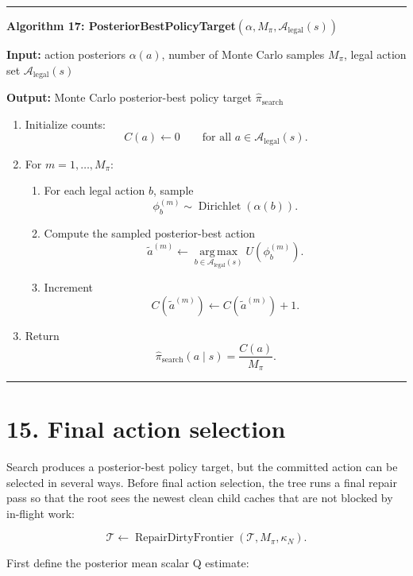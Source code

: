 \documentclass[11pt]{article}
\newcommand{\Dir}{\operatorname{Dirichlet}}
\newcommand{\argmax}{\operatorname*{arg\,max}}
\newcommand{\Tree}{\mathcal{T}}
\newcommand{\Legal}{\mathcal{A}_{\mathrm{legal}}}
\newcommand{\Utility}{U}
\newcommand{\RepairDirtyFrontier}{\operatorname{RepairDirtyFrontier}}
\newenvironment{algorithmblock}[1]
{
  \par\medskip
  \noindent\hrule\par\smallskip
  \noindent\textbf{#1}
  \par\smallskip
}
{
  \par\smallskip\noindent\hrule\par\medskip
}
\newcommand{\Input}{\textbf{Input: }}
\newcommand{\Output}{\textbf{Output: }}
\begin{document}
\begin{algorithmblock}{Algorithm 17: PosteriorBestPolicyTarget\((\alpha,M_\pi,\Legal(s))\)}

\Input action posteriors \(\alpha(a)\), number of Monte Carlo samples \(M_\pi\), legal action set \(\Legal(s)\)

\Output Monte Carlo posterior-best policy target \(\hat{\pi}_{\mathrm{search}}\)

\begin{enumerate}[leftmargin=2em]
  \item Initialize counts:
  \[
  C(a)\gets 0
  \qquad
  \text{for all } a\in\Legal(s).
  \]

  \item For \(m=1,\ldots,M_\pi\):

  \begin{enumerate}[leftmargin=2em]
    \item For each legal action \(b\), sample
    \[
    \phi_b^{(m)}
    \sim
    \Dir(\alpha(b)).
    \]

    \item Compute the sampled posterior-best action
    \[
    \tilde a^{(m)}
    \gets
    \argmax_{b\in\Legal(s)}
    \Utility(\phi_b^{(m)}).
    \]

    \item Increment
    \[
    C(\tilde a^{(m)})
    \gets
    C(\tilde a^{(m)})+1.
    \]
  \end{enumerate}

  \item Return
  \[
  \hat{\pi}_{\mathrm{search}}(a\mid s)
  =
  \frac{C(a)}{M_\pi}.
  \]
\end{enumerate}

\end{algorithmblock}


\section*{15. Final action selection}

Search produces a posterior-best policy target, but the committed action can be
selected in several ways. Before final action selection, the tree runs a final
repair pass so that the root sees the newest clean child caches that are not
blocked by in-flight work:

\[
\Tree\gets\RepairDirtyFrontier(\Tree,M_\pi,\kappa_N).
\]

First define the posterior mean scalar Q estimate:
\end{document}
